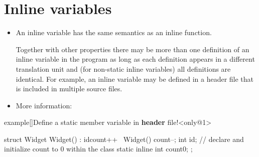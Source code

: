 \section{Inline variables}
\begin{frame}[fragile]{\insertsectionhead}
    \vspace{-3mm}
    \begin{itemize}
        \item An inline variable has the same semantics as an inline function.\\[1mm]
              {\scriptsize
                Together with other properties there may be more than one definition of an inline variable in the program as long as each definition appears in a different translation unit and (for non-static inline variables) all definitions are identical.
                For example, an inline variable may be defined in a header file that is included in multiple source files.\par}
        \item More information: 
    \end{itemize}
    \begin{varblock}{example}[\textwidth]{Define a static member variable in \textbf{header} file!}<only@1>
        \begin{Cpp}
            struct Widget {
                Widget() : id{count++} {}
                ~Widget() { count--; }
                int id;
                // declare and initialize count to 0 within the class
                static inline int count{0};
            };
        \end{Cpp}
    \end{varblock}
\end{frame}

